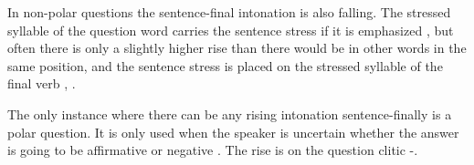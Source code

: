 
In non-polar questions the sentence-final intonation is also falling. The stressed syllable of the question word carries the sentence stress if it is emphasized , but often there is only a slightly higher rise than there would be in other words in the same position, and the sentence stress is placed on the stressed syllable of the final verb , .










The only instance where there can be any rising intonation sentence-finally is a polar question.  It is only used when the speaker is uncertain whether the answer is going to be affirmative or negative .  The rise is on the question clitic -.  





